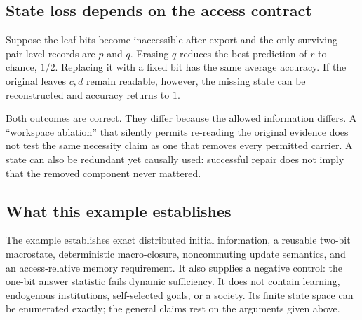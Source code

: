 \documentclass[11pt,letterpaper]{article}
\theoremstyle{plain}
\theoremstyle{definition}
\theoremstyle{remark}
\begin{document}
\subsection{State loss depends on the access contract}
Suppose the leaf bits become inaccessible after export and the only surviving pair-level records are $p$ and $q$. Erasing $q$ reduces the best prediction of $r$ to chance, $1/2$. Replacing it with a fixed bit has the same average accuracy. If the original leaves $c,d$ remain readable, however, the missing state can be reconstructed and accuracy returns to $1$.

Both outcomes are correct. They differ because the allowed information differs. A ``workspace ablation'' that silently permits re-reading the original evidence does not test the same necessity claim as one that removes every permitted carrier. A state can also be redundant yet causally used: successful repair does not imply that the removed component never mattered.

\subsection{What this example establishes}
The example establishes exact distributed initial information, a reusable two-bit macrostate, deterministic macro-closure, noncommuting update semantics, and an access-relative memory requirement. It also supplies a negative control: the one-bit answer statistic fails dynamic sufficiency. It does not contain learning, endogenous institutions, self-selected goals, or a society. Its finite state space can be enumerated exactly; the general claims rest on the arguments given above.
\end{document}
